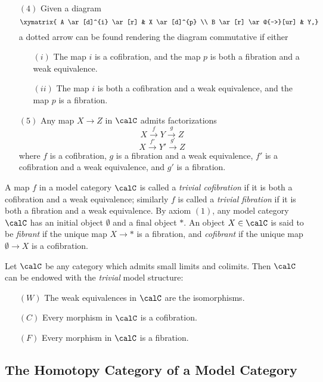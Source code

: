 \begin{Model Categories}
\begin{Already Read}
\begin{definition}
\begin{itemize}
\item[$(4)$] Given a diagram
$$ \xymatrix{ A \ar[d]^{i} \ar[r] & X \ar[d]^{p} \\
B \ar[r] \ar@{-->}[ur] & Y,}$$
a dotted arrow can be found rendering the diagram commutative if either
\begin{itemize}
\item[$(i)$] The map $i$ is a cofibration, and the map $p$ is both a fibration and a weak equivalence.
\item[$(ii)$] The map $i$ is both a cofibration and a weak equivalence, and the map $p$ is a fibration.
\end{itemize}
\item[$(5)$] Any map $X \rightarrow Z$ in $\calC$ admits factorizations
$$ X \stackrel{f}{\rightarrow} Y \stackrel{g}{\rightarrow} Z$$
$$ X \stackrel{f'}{\rightarrow} Y' \stackrel{g'}{\rightarrow} Z$$
where $f$ is a cofibration, $g$ is a fibration and a weak equivalence, $f'$ is a cofibration and a weak equivalence, and $g'$ is a fibration.
\end{itemize}
\end{definition}

A map $f$ in a model category $\calC$ is called a {\it trivial cofibration} if it is both a cofibration and a weak equivalence; similarly $f$ is called a {\it trivial fibration} if it is both a fibration and a weak equivalence. By axiom $(1)$, any model category $\calC$ has an initial object $\emptyset$
and a final object $\ast$. An object $X \in \calC$ is said to be {\it fibrant} if the unique map
$X \rightarrow \ast$ is a fibration, and {\it cofibrant} if the unique map $\emptyset \rightarrow X$ is a cofibration.

\begin{example}\label{trivmodel}
Let $\calC$ be any category which admits small limits and colimits. Then
$\calC$ can be endowed with the {\em trivial} model structure:
\begin{itemize}
\item[$(W)$] The weak equivalences in $\calC$ are the isomorphisms.
\item[$(C)$] Every morphism in $\calC$ is a cofibration.
\item[$(F)$] Every morphism in $\calC$ is a fibration. 
\end{itemize}
\end{example}

\subsection{The Homotopy Category of a Model Category}


\end{Already Read}
\end{Model Categories}
